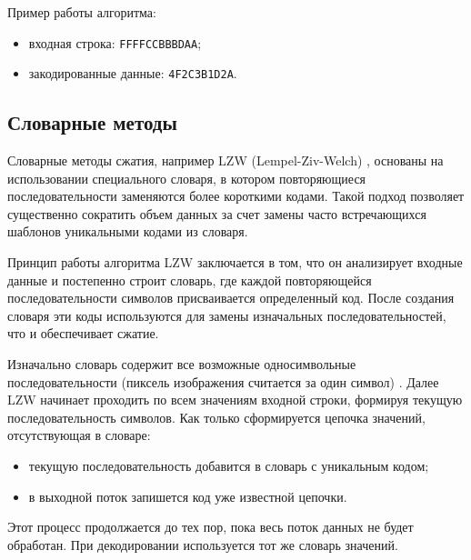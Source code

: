 Пример работы алгоритма:
\begin{itemize}
    \item входная строка: \texttt{FFFFCCBBBDAA};
    \item закодированные данные: \texttt{4F2C3B1D2A}.
\end{itemize}

\subsection{Словарные методы}

Словарные методы сжатия, например LZW (Lempel-Ziv-Welch) \cite{LZW}, основаны на использовании специального словаря, в котором повторяющиеся последовательности заменяются более короткими кодами. Такой подход позволяет существенно сократить объем данных за счет замены часто встречающихся шаблонов уникальными кодами из словаря.

Принцип работы алгоритма LZW заключается в том, что он анализирует входные данные и постепенно строит словарь, где каждой повторяющейся последовательности символов присваивается определенный код. После создания словаря эти коды используются для замены изначальных последовательностей, что и обеспечивает сжатие.

Изначально словарь содержит все возможные односимвольные последовательности (пиксель изображения считается за один символ) \cite{LZW-2}. Далее LZW начинает проходить по всем значениям входной строки, формируя текущую последовательность символов. 
Как только сформируется цепочка значений, отсутствующая в словаре:
\begin{itemize}
    \item текущую последовательность добавится в словарь с уникальным кодом;
    \item в выходной поток запишется код уже известной цепочки.
\end{itemize}
Этот процесс продолжается до тех пор, пока весь поток данных не будет обработан. При декодировании используется тот же словарь значений.

